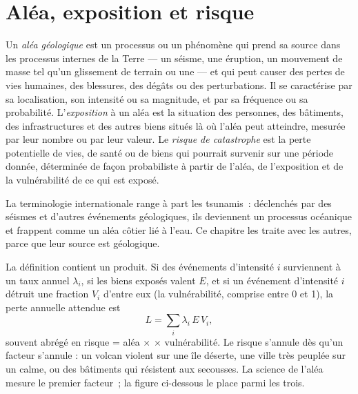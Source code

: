 \section{Aléa, exposition et risque}\label{sec:b2:geological-hazards:risk}

\begin{definition}\label{def:b2:geological-hazards:risk}
Un \emph{aléa géologique} est un processus ou un phénomène qui prend sa source dans
les processus internes de la Terre --- un séisme, une éruption, un mouvement de masse tel qu'un glissement
de terrain ou une  --- et qui peut causer des pertes de vies humaines, des blessures, des
dégâts ou des perturbations. Il se caractérise par sa localisation, son intensité ou sa magnitude, et par sa
fréquence ou sa probabilité. L'\emph{exposition} à un aléa est la situation
des personnes, des bâtiments, des infrastructures et des autres biens situés là où l'aléa peut atteindre,
mesurée par leur nombre ou par leur valeur. Le \emph{risque de catastrophe} est
la perte potentielle de vies, de santé ou de biens qui pourrait survenir sur une période donnée, déterminée
de façon probabiliste à partir de l'aléa, de l'exposition et de la vulnérabilité de ce qui est exposé.
\end{definition}

La terminologie internationale range à part les tsunamis~: déclenchés par des séismes et d'autres
événements géologiques, ils deviennent un processus océanique et frappent comme un aléa côtier
lié à l'eau. Ce chapitre les traite avec les autres, parce que leur source est géologique.

La définition contient un produit. Si des événements d'intensité $i$ surviennent à un taux annuel
$\lambda_i$, si les biens exposés valent $E$, et si un événement d'intensité $i$ détruit une
fraction $V_i$ d'entre eux (la vulnérabilité, comprise entre 0 et 1), la perte annuelle attendue est
\begin{equation}
L = \sum_i \lambda_i \, E \, V_i ,
\label{eq:b2:geological-hazards:loss}
\end{equation}
souvent abrégé en risque = aléa $\times$  $\times$ vulnérabilité. Le risque
s'annule dès qu'un facteur s'annule : un volcan violent sur une île déserte, une ville
très peuplée sur un  calme, ou des bâtiments qui résistent aux secousses. La science
de l'aléa mesure le premier facteur~; la figure ci-dessous le place parmi les trois.

